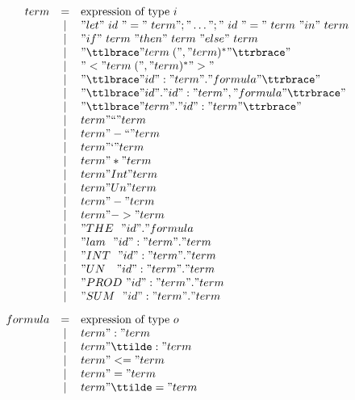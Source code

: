 \begin{figure} 
\dquotes
\[\begin{array}{rcl}
    term & = & \hbox{expression of type~$i$} \\
         & | & "let"~id~"="~term";"\dots";"~id~"="~term~"in"~term \\
         & | & "if"~term~"then"~term~"else"~term \\
         & | & "{\ttlbrace} " term\; ("," term)^* " {\ttrbrace}" \\
         & | & "< "  term\; ("," term)^* " >"  \\
         & | & "{\ttlbrace} " id ":" term " . " formula " {\ttrbrace}" \\
         & | & "{\ttlbrace} " id " . " id ":" term ", " formula " {\ttrbrace}" \\
         & | & "{\ttlbrace} " term " . " id ":" term " {\ttrbrace}" \\
         & | & term " `` " term \\
         & | & term " -`` " term \\
         & | & term " ` " term \\
         & | & term " * " term \\
         & | & term " Int " term \\
         & | & term " Un " term \\
         & | & term " - " term \\
         & | & term " -> " term \\
         & | & "THE~~"  id  " . " formula\\
         & | & "lam~~"  id ":" term " . " term \\
         & | & "INT~~"  id ":" term " . " term \\
         & | & "UN~~~"  id ":" term " . " term \\
         & | & "PROD~"  id ":" term " . " term \\
         & | & "SUM~~"  id ":" term " . " term \\[2ex]
 formula & = & \hbox{expression of type~$o$} \\
         & | & term " : " term \\
         & | & term " \ttilde: " term \\
         & | & term " <= " term \\
         & | & term " = " term \\
         & | & term " \ttilde= " term \\

\end{array}\]
\end{figure}
